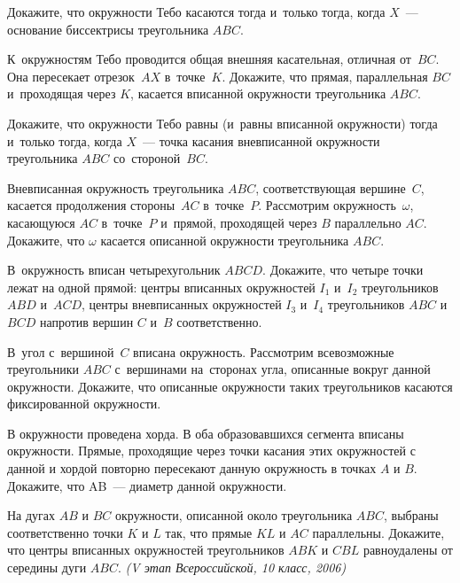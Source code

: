 \begin{problems}

\item
Докажите, что окружности Тебо касаются тогда и~только тогда, когда $X$~---
основание биссектрисы треугольника $ABC$.

\item
К~окружностям Тебо проводится общая внешняя касательная, отличная от~$BC$.
Она пересекает отрезок~$AX$ в~точке~$K$.
Докажите, что прямая, параллельная $BC$ и~проходящая через $K$, касается
вписанной окружности треугольника $ABC$.

\item
Докажите, что окружности Тебо равны (и~равны вписанной окружности) тогда
и~только тогда, когда $X$~--- точка касания вневписанной окружности
треугольника $ABC$ со~стороной~$BC$.

\item
Вневписанная окружность треугольника $ABC$, соответствующая вершине~$C$,
касается продолжения стороны~$AC$ в~точке~$P$.
Рассмотрим окружность~$\omega$, касающуюся $AC$ в~точке~$P$ и~прямой,
проходящей через $B$ параллельно $AC$.
Докажите, что $\omega$ касается описанной окружности треугольника $ABC$.

\item
В~окружность вписан четырехугольник $ABCD$.
Докажите, что четыре точки лежат на одной прямой:
центры вписанных окружностей $I_{1}$ и~$I_{2}$ треугольников $ABD$ и~$ACD$,
центры вневписанных окружностей $I_{3}$ и~$I_{4}$ треугольников $ABC$ и~$BCD$
напротив вершин $C$ и~$B$ соответственно.

\item
В~угол с~вершиной~$C$ вписана окружность.
Рассмотрим всевозможные треугольники $ABC$ с~вершинами на~сторонах угла,
описанные вокруг данной окружности.
Докажите, что описанные окружности таких треугольников касаются фиксированной
окружности.

\iffalse

\item
В окружности проведена хорда.
В оба образовавшихся сегмента вписаны окружности.
Прямые, проходящие через точки касания этих окружностей с данной и хордой
повторно пересекают данную окружность в точках $A$ и $B$.
Докажите, что AB~--- диаметр данной окружности.

\item
На дугах $AB$ и $BC$ окружности, описанной около треугольника $ABC$, выбраны
соответственно точки $K$ и $L$ так, что прямые $KL$ и $AC$ параллельны.
Докажите, что центры вписанных окружностей треугольников $ABK$ и $CBL$
равноудалены от середины дуги $ABC$.
\emph{(V этап Всероссийской, 10 класс, 2006)}


\end{problems}
